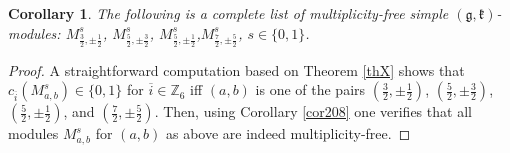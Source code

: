 \documentclass[12pt]{amsart}
\theoremstyle{plain} %
\newtheorem{corollary}[definition]{Corollary}
\newcommand {\ZZ} {\mathbb {Z}}
\newcommand{\kk}{\mathfrak{k}}
\renewcommand{\gg}{\mathfrak{g}}
\newcommand{\half}{\frac{1}{2}}
\newcommand{\threehalfs}{\frac{3}{2}}
\newcommand{\refth}[1]{Theorem \ref{#1}}
\newcommand{\refcor}[1]{Corollary \ref{#1}}
\newcommand {\gkm} {$(\gg,\kk)$-module}
\begin{document}
\begin{corollary}\label{cor712}
The following is a complete list of multiplicity-free simple \gkm s: $M_{\threehalfs,\pm\half}^{s}$,  $M_{\frac{5}{2},\pm \threehalfs}^s$, $M_{\frac{5}{2},\pm\half}^{s}$,$M_{\frac{7}{2},\pm\frac{5}{2}}^{s}$, $s\in\{0,1\}$.
\end{corollary}
\begin {proof}
A straightforward computation based on \refth{thX} shows that $c_{\overline{i}}(M_{a,b}^s)\in\{0,1\}$ for $\overline{i}\in\ZZ_6$ iff $(a,b)$ is one of the pairs $\displaystyle\left(\frac{3}{2},\pm\frac{1}{2} \right)$, $\displaystyle\left(\frac{5}{2},\pm\frac{3}{2} \right)$, $\displaystyle\left(\frac{5}{2},\pm\frac{1}{2} \right)$, and $\displaystyle\left(\frac{7}{2},\pm\frac{5}{2} \right)$. Then, using \refcor{cor208} one verifies that all modules $M_{a,b}^s$ for $(a,b)$ as above are indeed multiplicity-free.
\end{proof}
\end{document}
